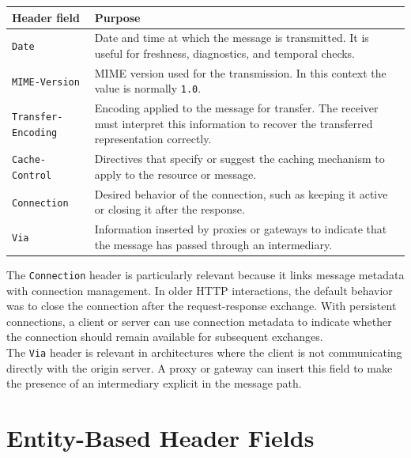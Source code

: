 \documentclass{scrbook}
\begin{document}
\begin{table}[!h]
	\begin{tabularx}{\linewidth}{p{}X}
	\textbf{Header field} & \textbf{Purpose} \\
	\hline
	\texttt{Date} & Date and time at which the message is transmitted. It is useful for freshness, diagnostics, and temporal checks. \\ \hline
	
	\texttt{MIME-Version} & MIME version used for the transmission. In this context the value is normally \texttt{1.0}. \\ \hline
	
	\texttt{Transfer-Encoding} & Encoding applied to the message for transfer. The receiver must interpret this information to recover the transferred representation correctly. \\ \hline
	
	\texttt{Cache-Control} & Directives that specify or suggest the caching mechanism to apply to the resource or message. \\ \hline
	
	\texttt{Connection} & Desired behavior of the connection, such as keeping it active or closing it after the response. \\ \hline
	
	\texttt{Via} & Information inserted by proxies or gateways to indicate that the message has passed through an intermediary. \\ \hline
	\end{tabularx}
\end{table}

The \texttt{Connection} header is particularly relevant because it links message metadata with connection management. In older HTTP interactions, the default behavior was to close the connection after the request-response exchange. With persistent connections, a client or server can use connection metadata to indicate whether the connection should remain available for subsequent exchanges.\\

The \texttt{Via} header is relevant in architectures where the client is not communicating directly with the origin server. A proxy or gateway can insert this field to make the presence of an intermediary explicit in the message path.

\newpage
\section{Entity-Based Header Fields}
\end{document}
